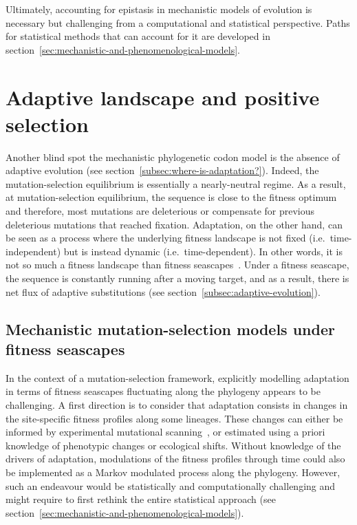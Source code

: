 Ultimately, accounting for epistasis in mechanistic models of evolution is necessary but challenging from a computational and statistical perspective.
Paths for statistical methods that can account for it are developed in section~\ref{sec:mechanistic-and-phenomenological-models}.

\section{Adaptive landscape and positive selection}
\label{sec:adaptative-landscape}

Another blind spot the mechanistic phylogenetic \gls{codon} model is the absence of adaptive evolution (see section~\ref{subsec:where-is-adaptation?}).
Indeed, the mutation-selection equilibrium is essentially a \gls{nearly-neutral} regime.
As a result, at mutation-selection equilibrium, the sequence is close to the fitness optimum and therefore, most mutations are deleterious or compensate for previous deleterious mutations that reached fixation.
Adaptation, on the other hand, can be seen as a process where the underlying fitness landscape is not fixed (i.e.~time-independent) but is instead dynamic (i.e.~time-dependent).
In other words, it is not so much a fitness landscape than fitness seascapes~\citep{Mustonen2009}.
Under a fitness seascape, the sequence is constantly running after a moving target, and as a result, there is net flux of adaptive \glspl{substitution} (see section~\ref{subsec:adaptive-evolution}).

\subsection{Mechanistic mutation-selection models under fitness seascapes}
\label{subsec:mechanistic-fluctuating-selection}

In the context of a mutation-selection framework, explicitly modelling adaptation in terms of fitness seascapes fluctuating along the phylogeny appears to be challenging.
A first direction is to consider that adaptation consists in changes in the site-specific fitness profiles along some lineages.
These changes can either be informed by experimental mutational scanning~\citep{Bloom2017}, or estimated using a priori knowledge of phenotypic changes or ecological shifts\citep{Tamuri2009, Parto2017, Parto2018}.
Without knowledge of the drivers of adaptation, modulations of the fitness profiles through time could also be implemented as a Markov modulated process along the phylogeny.
However, such an endeavour would be statistically and computationally challenging and might require to first rethink the entire statistical approach (see section~\ref{sec:mechanistic-and-phenomenological-models}).


